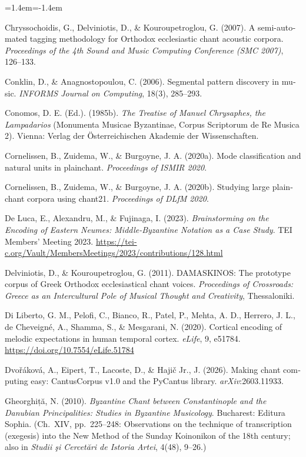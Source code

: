 \documentclass[11pt,a4paper]{article}
\newenvironment{reflist}{\begin{list}{}{\leftmargin=1.4em\itemindent=-1.4em\itemsep=0.8pt\parsep=0pt}\small}{\end{list}}
\begin{document}
\begin{otherlanguage}{english}
\begin{reflist}
\item Chryssochoidis, G., Delviniotis, D., \& Kouroupetroglou, G. (2007). A semi-automated tagging methodology for Orthodox ecclesiastic chant acoustic corpora. \emph{Proceedings of the 4th Sound and Music Computing Conference (SMC 2007)}, 126--133.
\item Conklin, D., \& Anagnostopoulou, C. (2006). Segmental pattern discovery in music. \emph{INFORMS Journal on Computing}, 18(3), 285--293.
\item Conomos, D. E. (Ed.). (1985b). \emph{The Treatise of Manuel Chrysaphes, the Lampadarios} (Monumenta Musicae Byzantinae, Corpus Scriptorum de Re Musica 2). Vienna: Verlag der Österreichischen Akademie der Wissenschaften.
\item Cornelissen, B., Zuidema, W., \& Burgoyne, J. A. (2020a). Mode classification and natural units in plainchant. \emph{Proceedings of ISMIR 2020}.
\item Cornelissen, B., Zuidema, W., \& Burgoyne, J. A. (2020b). Studying large plainchant corpora using chant21. \emph{Proceedings of DLfM 2020}.
\item De Luca, E., Alexandru, M., \& Fujinaga, I. (2023). \emph{Brainstorming on the Encoding of Eastern Neumes: Middle-Byzantine Notation as a Case Study}. TEI Members' Meeting 2023. \url{https://tei-c.org/Vault/MembersMeetings/2023/contributions/128.html}
\item Delviniotis, D., \& Kouroupetroglou, G. (2011). DAMASKINOS: The prototype corpus of Greek Orthodox ecclesiastical chant voices. \emph{Proceedings of Crossroads: Greece as an Intercultural Pole of Musical Thought and Creativity}, Thessaloniki.
\item Di Liberto, G. M., Pelofi, C., Bianco, R., Patel, P., Mehta, A. D., Herrero, J. L., de Cheveigné, A., Shamma, S., \& Mesgarani, N. (2020). Cortical encoding of melodic expectations in human temporal cortex. \emph{eLife}, 9, e51784. \url{https://doi.org/10.7554/eLife.51784}
\item Dvořáková, A., Eipert, T., Lacoste, D., \& Hajič Jr., J. (2026). Making chant computing easy: CantusCorpus v1.0 and the PyCantus library. \emph{arXiv}:2603.11933.
\item Gheorghiță, N. (2010). \emph{Byzantine Chant between Constantinople and the Danubian Principalities: Studies in Byzantine Musicology}. Bucharest: Editura Sophia. (Ch.~XIV, pp.~225--248: Observations on the technique of transcription (exegesis) into the New Method of the Sunday Koinonikon of the 18th century; also in \emph{Studii şi Cercetări de Istoria Artei}, 4(48), 9--26.)

\end{reflist}
\end{otherlanguage}
\end{document}
